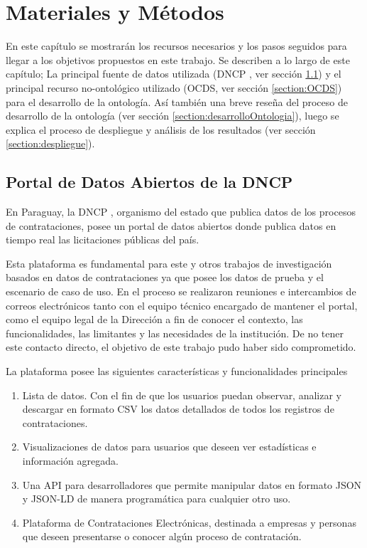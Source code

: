 \chapter{Materiales y Métodos}
\label{chap:MaterialesYMetodos}

En este capítulo se mostrarán los recursos necesarios y los pasos seguidos para llegar a los objetivos propuestos en este trabajo. Se describen a lo largo de este capítulo; La principal fuente de datos utilizada (DNCP \cite{DatosAbiDNCP:online}, ver sección \ref{section:portalDNCP}) y el principal recurso no-ontológico utilizado (OCDS, ver sección \ref{section:OCDS}) para el desarrollo de la ontología. Así también una breve reseña del proceso de desarrollo de la ontología (ver sección \ref{section:desarrolloOntologia}), luego se explica el proceso de despliegue y análisis de los resultados (ver sección \ref{section:despliegue}).

\section{Portal de Datos Abiertos de la DNCP}
\label{section:portalDNCP}

En Paraguay, la DNCP \cite{DatosAbiDNCP:online}, organismo del estado que publica datos de los procesos de contrataciones, posee un portal de datos abiertos donde publica datos en tiempo real las licitaciones públicas del país. 

Esta plataforma es fundamental para este y otros trabajos de investigación basados en datos de contrataciones ya que posee los datos de prueba y el escenario de caso de uso. En el proceso se realizaron reuniones e intercambios de correos electrónicos tanto con el equipo técnico encargado de mantener el portal, como el equipo legal de la Dirección a fin de conocer el contexto, las funcionalidades, las limitantes y las necesidades de la institución. De no tener este contacto directo, el objetivo de este trabajo pudo haber sido comprometido.

La plataforma posee las siguientes características y funcionalidades principales

\begin{enumerate}
    \item Lista de datos. Con el fin de que los usuarios puedan observar, analizar y descargar en formato CSV los datos detallados de todos los registros de contrataciones.
    \item Visualizaciones de datos para usuarios que deseen ver estadísticas e información agregada.
    \item Una API para desarrolladores que permite manipular datos en formato JSON y JSON-LD de manera programática para cualquier otro uso.
    \item Plataforma de Contrataciones Electrónicas, destinada a empresas y personas que deseen presentarse o conocer algún proceso de contratación.
\end{enumerate}

